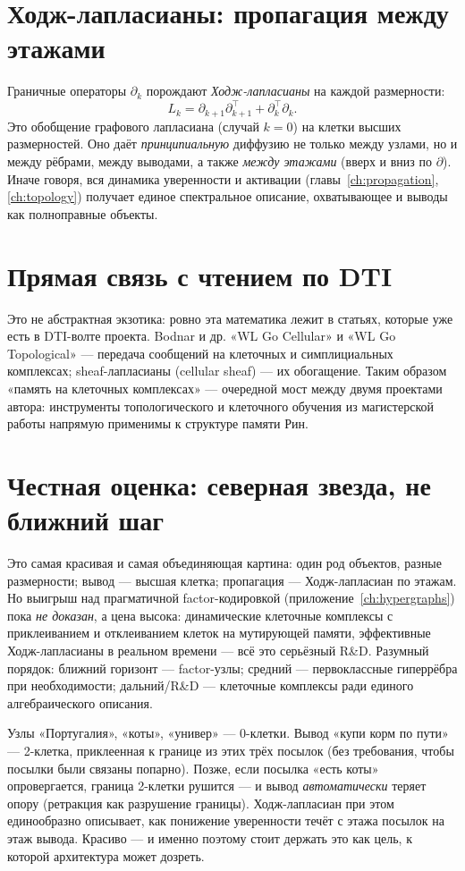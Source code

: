 \section{Ходж-лапласианы: пропагация между этажами}

Граничные операторы $\partial_k$ порождают \emph{Ходж-лапласианы} на каждой
размерности:
\[
L_k=\partial_{k+1}\partial_{k+1}^\top+\partial_k^\top\partial_k .
\]
Это обобщение графового лапласиана (случай $k=0$) на клетки высших размерностей. Оно
даёт \emph{принципиальную} диффузию не только между узлами, но и между рёбрами,
между выводами, а также \emph{между этажами} (вверх и вниз по $\partial$). Иначе
говоря, вся динамика уверенности и активации (главы~\ref{ch:propagation},
\ref{ch:topology}) получает единое спектральное описание, охватывающее и выводы как
полноправные объекты.

\section{Прямая связь с чтением по DTI}

Это не абстрактная экзотика: ровно эта математика лежит в статьях, которые уже есть в
DTI-волте проекта. Bodnar и др. «WL Go Cellular» и «WL Go Topological» — передача
сообщений на клеточных и симплициальных комплексах; sheaf-лапласианы (cellular sheaf)
— их обогащение. Таким образом «память на клеточных комплексах» — очередной мост
между двумя проектами автора: инструменты топологического и клеточного обучения из
магистерской работы напрямую применимы к структуре памяти Рин.

\section{Честная оценка: северная звезда, не ближний шаг}

\begin{principle}
Это самая красивая и самая объединяющая картина: один род объектов, разные
размерности; вывод — высшая клетка; пропагация — Ходж-лапласиан по этажам. Но
выигрыш над прагматичной factor-кодировкой (приложение~\ref{ch:hypergraphs}) пока
\emph{не доказан}, а цена высока: динамические клеточные комплексы с приклеиванием и
отклеиванием клеток на мутирующей памяти, эффективные Ходж-лапласианы в реальном
времени — всё это серьёзный R\&D. Разумный порядок: ближний горизонт — factor-узлы;
средний — первоклассные гиперрёбра при необходимости; дальний/R\&D — клеточные
комплексы ради единого алгебраического описания.
\end{principle}

\begin{workedbox}
Узлы «Португалия», «коты», «универ» — 0-клетки. Вывод «купи корм по пути» — 2-клетка,
приклеенная к границе из этих трёх посылок (без требования, чтобы посылки были
связаны попарно). Позже, если посылка «есть коты» опровергается, граница 2-клетки
рушится — и вывод \emph{автоматически} теряет опору (ретракция как разрушение
границы). Ходж-лапласиан при этом единообразно описывает, как понижение уверенности
течёт с этажа посылок на этаж вывода. Красиво — и именно поэтому стоит держать это
как цель, к которой архитектура может дозреть.
\end{workedbox}
